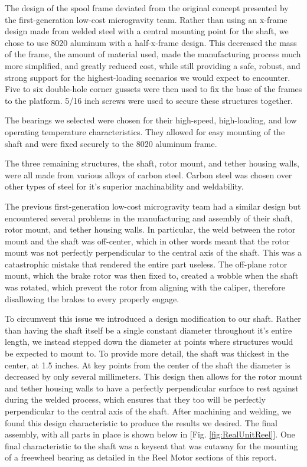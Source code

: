 The design of the spool frame deviated from the original concept presented by the first-generation low-cost microgravity team. Rather than using an x-frame design made from welded steel with a central mounting point for the shaft, we chose to use 8020 aluminum with a half-x-frame design. This decreased the mass of the frame, the amount of material used, made the manufacturing process much more simplified, and greatly reduced cost, while still providing a safe, robust, and strong support for the highest-loading scenarios we would expect to encounter. Five to six double-hole corner gussets were then used to fix the base of the frames to the platform. 5/16 inch screws were used to secure these structures together.

The bearings we selected were chosen for their high-speed, high-loading, and low operating temperature characteristics. They allowed for easy mounting of the shaft and were fixed securely to the 8020 aluminum frame. 

The three remaining structures, the shaft, rotor mount, and tether housing walls, were all made from various alloys of carbon steel. Carbon steel was chosen over other types of steel for it's superior machinability and weldability. 

The previous first-generation low-cost microgravity team had a similar design but encountered several problems in the manufacturing and assembly of their shaft, rotor mount, and tether housing walls. In particular, the weld between the rotor mount and the shaft was off-center, which in other words meant that the rotor mount was not perfectly perpendicular to the central axis of the shaft. This was a catastrophic mistake that rendered the entire part useless. The off-plane rotor mount, which the brake rotor was then fixed to, created a wobble when the shaft was rotated, which prevent the rotor from aligning with the caliper, therefore disallowing the brakes to every properly engage. 

To circumvent this issue we introduced a design modification to our shaft. Rather than having the shaft itself be a single constant diameter throughout it's entire length, we instead stepped down the diameter at points where structures would be expected to mount to. To provide more detail, the shaft was thickest in the center, at 1.5 inches. At key points from the center of the shaft the diameter is decreased by only several millimeters. This design then allows for the rotor mount and tether housing walls to have a perfectly perpendicular surface to rest against during the welded process, which ensures that they too will be perfectly perpendicular to the central axis of the shaft. After machining and welding, we found this design characteristic to produce the results we desired. The final assembly, with all parts in place is shown below in [Fig. \ref{fig:RealUnitReel}]. One final characteristic to the shaft was a keyseat that was cutaway for the mounting of a freewheel bearing as detailed in the Reel Motor sections of this report. 

